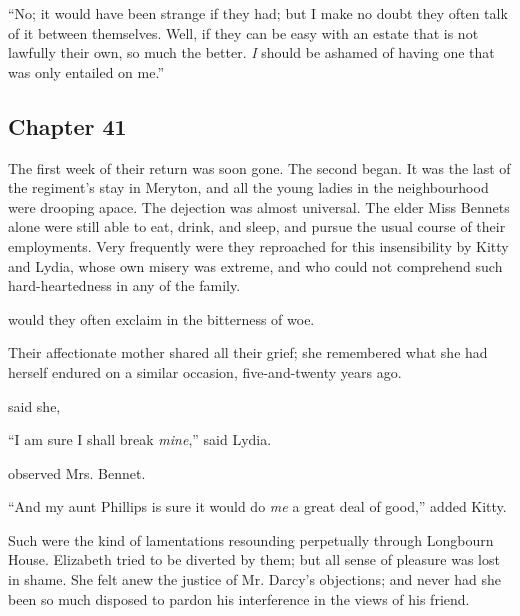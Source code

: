
“No; it would have been strange if they had; but I make no doubt they often talk of it between themselves. Well, if they can be easy with an estate that is not lawfully their own, so much the better. {\em I} should be ashamed of having one that was only entailed on me.”

\subsection[chapter-41]{\useURL[url41][][][]\from[url41] Chapter 41}

The first week of their return was soon gone. The second began. It was the last of the regiment's stay in Meryton, and all the young ladies in the neighbourhood were drooping apace. The dejection was almost universal. The elder Miss Bennets alone were still able to eat, drink, and sleep, and pursue the usual course of their employments. Very frequently were they reproached for this insensibility by Kitty and Lydia, whose own misery was extreme, and who could not comprehend such hard-heartedness in any of the family.

 would they often exclaim in the bitterness of woe. 

Their affectionate mother shared all their grief; she remembered what she had herself endured on a similar occasion, five-and-twenty years ago.

 said she, 

“I am sure I shall break {\em mine},” said Lydia.

 observed Mrs. Bennet.



“And my aunt Phillips is sure it would do {\em me} a great deal of good,” added Kitty.

Such were the kind of lamentations resounding perpetually through Longbourn House. Elizabeth tried to be diverted by them; but all sense of pleasure was lost in shame. She felt anew the justice of Mr. Darcy's objections; and never had she been so much disposed to pardon his interference in the views of his friend.


